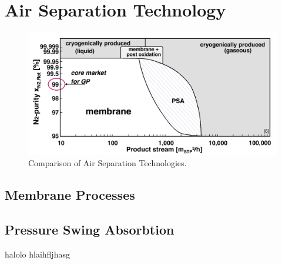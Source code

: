 \chapter{Air Separation Technology}
\label{chp:airsep}

\begin{figure}
	\includegraphics[width=\textwidth]{Pictures/tech_compar}
	\caption{Comparison of Air Separation Technologies.}
	\label{fig:tech_compar}
\end{figure}

\section{Membrane Processes}
\label{sec:membrane}

\section{Pressure Swing Absorbtion}
\label{sec:psa}


halolo hlaihfljhasg